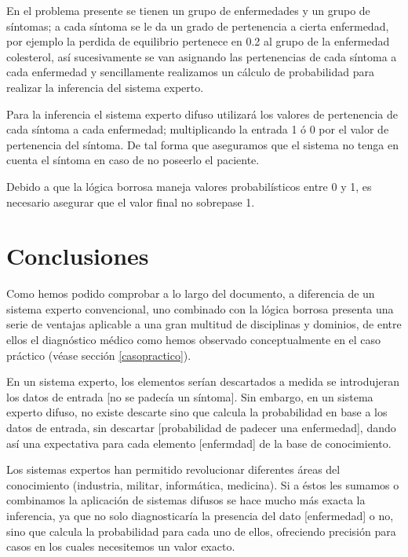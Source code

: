 \documentclass[a4paper, 11pt, titlepage]{article}
\begin{document}
        En el problema presente se tienen un grupo de enfermedades y un grupo de síntomas; a cada síntoma 
        se le da un grado de pertenencia a cierta enfermedad, por ejemplo la perdida de equilibrio pertenece 
        en 0.2 al grupo de la enfermedad colesterol, así sucesivamente se van asignando las pertenencias de
        cada síntoma a cada enfermedad y sencillamente realizamos un cálculo de probabilidad para realizar 
        la inferencia del sistema experto.

        Para la inferencia el sistema experto difuso utilizará los valores de pertenencia de cada síntoma 
        a cada  enfermedad; multiplicando la entrada 1 ó 0 por el valor de pertenencia del síntoma. De tal 
        forma que aseguramos que el sistema no tenga en cuenta el síntoma en caso de no poseerlo el paciente.  

        Debido a que la lógica borrosa maneja valores probabilísticos entre 0 y 1, es necesario asegurar que el valor 
        final no sobrepase 1. 

\section{Conclusiones}

    Como hemos podido comprobar a lo largo del documento, a diferencia de un sistema experto convencional, uno 
    combinado con la lógica borrosa presenta una serie de ventajas aplicable a una gran multitud de disciplinas 
    y dominios, de entre ellos el diagnóstico médico como hemos observado conceptualmente en el caso práctico 
    (véase sección \ref{casopractico}).

    En un sistema experto, los elementos serían descartados a medida se introdujeran los datos de entrada [no 
    se padecía un síntoma]. Sin embargo, en un sistema experto difuso, no existe descarte sino que calcula 
    la probabilidad en base a los datos de entrada, sin descartar [probabilidad de padecer una enfermedad], dando 
    así una expectativa para cada elemento [enfermdad] de la base de conocimiento.
    
    Los sistemas expertos han permitido revolucionar diferentes áreas del conocimiento  (industria, militar, informática,
    medicina). Si a éstos les sumamos o combinamos la aplicación de sistemas difusos se hace mucho más exacta la 
    inferencia, ya que no solo diagnosticaría la presencia del dato [enfermedad] o no, sino que calcula la probabilidad 
    para cada uno de ellos, ofreciendo precisión para casos en los cuales necesitemos un valor exacto.
\end{document}
